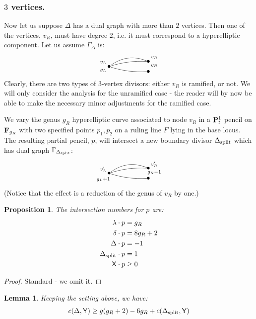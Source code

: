 \documentclass[reqno, 10 pt]{article}
\newtheorem{lem}[thm]{Lemma}
\newtheorem{prop}[thm]{Proposition}
\theoremstyle{definition}
\theoremstyle{remark}
\numberwithin{equation}{section}
\numberwithin{thm}{section}
\numberwithin{prop}{section}
\numberwithin{lem}{section}
\numberwithin{cor}{section}
\numberwithin{conj}{section}
\numberwithin{defn}{section}
\newcommand{\sfY}{{\mathsf Y}}
\newcommand{\sfX}{{\mathsf X}}
\newcommand {\spl}{{\rm split}}
\begin{document}
 \subsubsection{$3$ vertices.} Now let us suppose $\Delta$ has a dual graph with more than $2$ vertices.  Then one of the vertices, $v_R$, must have degree $2$, i.e. it must correspond to a hyperelliptic component.  Let us assume $\Gamma_\Delta$ is: \[   \xygraph{
!{<0cm,0cm>;<1cm,0cm>:<0cm,1cm>::}
!{(0,-.25)}*{\bullet}="l"!{(-.3,-.45)}{\scriptstyle g_L}!{(-.3,-.05)}{\scriptstyle v_{L}}
!{(2,0) }*{\bullet}="b"!{(2.3,.2)}{\scriptstyle v_R}!{(2.3,-.2)}{\scriptstyle g_R}
!{(2,-.5) }*{\bullet}="a_1"
 "l"-@/^.3cm/"b"
 "l"-@/^.1cm/"b"
"l"-@/_.1cm/"a_1"
}  \] Clearly, there are two types of $3$-vertex divisors: either $v_R$ is ramified, or not.   We will only consider the analysis for the unramified case - the reader will by now be able to make the necessary minor adjustments for the ramified case.
 
 We vary the genus $g_R$ hyperelliptic curve associated to node $v_R$ in a ${\bf P}^1_{t}$ pencil on ${\bf F}_{g_R}$ with two specified points $p_1, p_2$ on a ruling line  $F$ lying in the base locus.  The resulting partial pencil, $p$, will intersect a new boundary divisor $\Delta_{\spl}$ which has dual graph $\Gamma_{\Delta_{\spl}}$:  \[   \xygraph{
!{<0cm,0cm>;<1cm,0cm>:<0cm,1cm>::}
!{(0,-.25)}*{\bullet}="l"!{(-.3,-.55)}{\scriptstyle g_L+1}!{(-.3,-.05)}{\scriptstyle v'_{L}}
!{(2,0) }*{\bullet}="b"!{(2.3,.2)}{\scriptstyle v'_R}!{(2.3,-.2)}{\scriptstyle g_R-1}
!{(2,-.5) }*{\bullet}="a_1"
 "l"-@/^.3cm/"b"
 "l"-@/^.1cm/"b"
"l"-@/_.1cm/"a_1"
}  \] (Notice that the effect is a reduction of the genus of $v_R$ by one.)  

\begin{prop}\label{3vertex}
The intersection numbers for $p$ are:
  \begin{align*}
\lambda \cdot p &= g_R\\
\delta \cdot p &= 8g_R +2\\
\Delta \cdot p &= -1\\
\Delta_{\spl} \cdot p &= 1\\
{\sfX} \cdot p &\geq 0
\end{align*}
\end{prop}
 
\begin{proof}
Standard - we omit it.
\end{proof}

 \begin{lem} Keeping the setting above, we have:
 \begin{equation}
 c(\Delta,{\sfY}) \geq g(g_R+2)-6g_R + c(\Delta_{\spl}, {\sfY})
 \end{equation}
 \end{lem}
 
\end{document}
